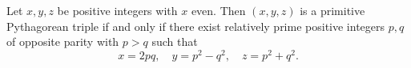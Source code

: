 Let $x, y, z$ be positive integers with $x$ even. Then $(x, y, z)$ is a primitive Pythagorean triple if and only if there exist relatively prime positive integers $p, q$ of opposite parity with $p > q$ such that
$$x = 2pq, \quad y = p^2 - q^2, \quad z = p^2 + q^2.$$
